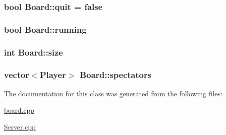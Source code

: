 \hypertarget{classBoard_a932321a5ea4ff75ab3651bb465ae9236}{
\subsubsection[{quit}]{\setlength{\rightskip}{0pt plus 5cm}bool Board\-::quit = false}}\label{classBoard_a932321a5ea4ff75ab3651bb465ae9236}
\hypertarget{classBoard_ab592d001f61d16b0d272b45d36a78eeb}{
\subsubsection[{running}]{\setlength{\rightskip}{0pt plus 5cm}bool Board\-::running}}\label{classBoard_ab592d001f61d16b0d272b45d36a78eeb}
\hypertarget{classBoard_aedef7105f0accc0949b601afa97e9678}{
\subsubsection[{size}]{\setlength{\rightskip}{0pt plus 5cm}int Board\-::size}}\label{classBoard_aedef7105f0accc0949b601afa97e9678}
\hypertarget{classBoard_a8c9035c16d22c8db02729d4ced267132}{
\subsubsection[{spectators}]{\setlength{\rightskip}{0pt plus 5cm}vector$<${\bf Player}$>$ Board\-::spectators}}\label{classBoard_a8c9035c16d22c8db02729d4ced267132}


The documentation for this class was generated from the following files\-:\begin{DoxyCompactItemize}
\item 
\hyperlink{board_8cpp}{board.\-cpp}\item 
\hyperlink{Server_8cpp}{Server.\-cpp}\end{DoxyCompactItemize}
